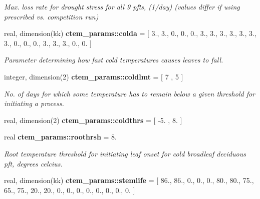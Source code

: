 \begin{DoxyCompactItemize}
\begin{DoxyCompactList}\small\item\em Max. loss rate for drought stress for all 9 pfts, (1/day) (values differ if using prescribed vs. competition run) \end{DoxyCompactList}\item 
\hypertarget{namespacectem__params_a261cdad7b84fcd118ef12b82da029bb7}{}real, dimension(kk) {\bfseries ctem\+\_\+params\+::colda} = \mbox{[} 3., 3., 0., 0., 0., 3., 3., 3., 3., 3., 3., 3., 0., 0., 0., 3., 3., 3., 0., 0. \mbox{]}\label{namespacectem__params_a261cdad7b84fcd118ef12b82da029bb7}

\begin{DoxyCompactList}\small\item\em Parameter determining how fast cold temperatures causes leaves to fall. \end{DoxyCompactList}\item 
\hypertarget{namespacectem__params_a3eee73b19e09e9aab077477b6d1d9419}{}integer, dimension(2) {\bfseries ctem\+\_\+params\+::coldlmt} = \mbox{[} 7 , 5 \mbox{]}\label{namespacectem__params_a3eee73b19e09e9aab077477b6d1d9419}

\begin{DoxyCompactList}\small\item\em No. of days for which some temperature has to remain below a given threshold for initiating a process. \end{DoxyCompactList}\item 
real, dimension(2) {\bfseries ctem\+\_\+params\+::coldthrs} = \mbox{[} -\/5. , 8. \mbox{]}
\item 
\hypertarget{namespacectem__params_a282fb31f18fec9021b409ebbb0a3882c}{}real {\bfseries ctem\+\_\+params\+::roothrsh} = 8.\label{namespacectem__params_a282fb31f18fec9021b409ebbb0a3882c}

\begin{DoxyCompactList}\small\item\em Root temperature threshold for initiating leaf onset for cold broadleaf deciduous pft, degrees celcius. \end{DoxyCompactList}\item 
\hypertarget{namespacectem__params_abc90906c9c70649408c5ad72dd96ce35}{}real, dimension(kk) {\bfseries ctem\+\_\+params\+::stemlife} = \mbox{[} 86., 86., 0., 0., 0., 80., 80., 75., 65., 75., 20., 20., 0., 0., 0., 0., 0., 0., 0., 0. \mbox{]}\label{namespacectem__params_abc90906c9c70649408c5ad72dd96ce35}


\end{DoxyCompactItemize}
